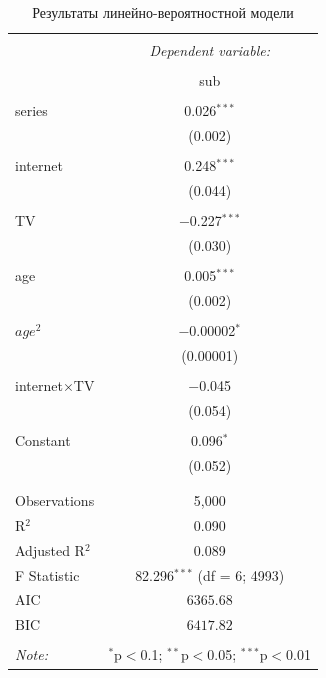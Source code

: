 \documentclass[a4paper,12pt]{article}
\begin{document}
	\begin{table}[!h] \centering 
		  \caption{Результаты линейно-вероятностной модели} 
		  \label{linear} 
		  \small
		\begin{tabular}{@{\extracolsep{5pt}}lc} 
		\\[-1.8ex]\hline 
		\hline \\[-1.8ex] 
		 & \multicolumn{1}{c}{\textit{Dependent variable:}} \\ 
		\cline{2-2} 
		\\[-1.8ex] & sub \\ 
		\hline \\[-1.8ex] 
		 series & 0.026$^{***}$ \\ 
		  & (0.002) \\ 
		  & \\ 
		 internet & 0.248$^{***}$ \\ 
		  & (0.044) \\ 
		  & \\ 
		 TV & $-$0.227$^{***}$ \\ 
		  & (0.030) \\ 
		  & \\ 
		 age & 0.005$^{***}$ \\ 
		  & (0.002) \\ 
		  & \\ 
		 $age^2$ & $-$0.00002$^{*}$ \\ 
		  & (0.00001) \\ 
		  & \\ 
		 internet$\times$TV & $-$0.045 \\ 
		  & (0.054) \\ 
		  & \\ 
		 Constant & 0.096$^{*}$ \\ 
		  & (0.052) \\ 
		  & \\ 
		\hline \\[-3ex] 
		Observations & 5,000 \\ 
		R$^{2}$ & 0.090 \\ 
		Adjusted R$^{2}$ & 0.089 \\ 
		F Statistic & 82.296$^{***}$ (df = 6; 4993) \\ 
		AIC            & $6365.68$     \\
		BIC            & $6417.82$     \\
		\hline 
		\hline \\[-1.8ex] 
		\textit{Note:}  & \multicolumn{1}{r}{$^{*}$p$<$0.1; $^{**}$p$<$0.05; $^{***}$p$<$0.01} \\ 
	\end{tabular} 
	\end{table} 
			
\end{document}
